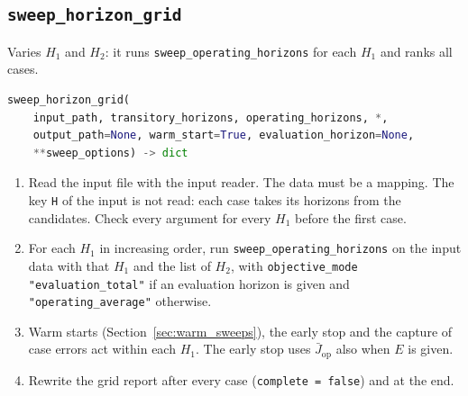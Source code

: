 \subsection{\texttt{sweep\_horizon\_grid}}
\label{sec:sweep_grid}

Varies $H_1$ and $H_2$: it runs \texttt{sweep\_operating\_horizons} for each $H_1$ and ranks all cases.

\begin{lstlisting}[language=Python]
sweep_horizon_grid(
    input_path, transitory_horizons, operating_horizons, *,
    output_path=None, warm_start=True, evaluation_horizon=None,
    **sweep_options) -> dict
\end{lstlisting}

\tabend

\begin{enumerate}[nosep,label=\arabic*.]
  \item Read the input file with the input reader. The data must be a mapping. The key \texttt{H} of the input is not read: each case takes its horizons from the candidates. Check every argument for every $H_1$ before the first case.
  \item For each $H_1$ in increasing order, run \texttt{sweep\_operating\_horizons} on the input data with that $H_1$ and the list of $H_2$, with \texttt{objective\_mode} \texttt{"evaluation\_total"} if an evaluation horizon is given and \texttt{"operating\_average"} otherwise.
  \item Warm starts (Section~\ref{sec:warm_sweeps}), the early stop and the capture of case errors act within each $H_1$. The early stop uses $\bar J_{\mathrm{op}}$ also when $E$ is given.
  \item Rewrite the grid report after every case (\texttt{complete = false}) and at the end.
\end{enumerate}

